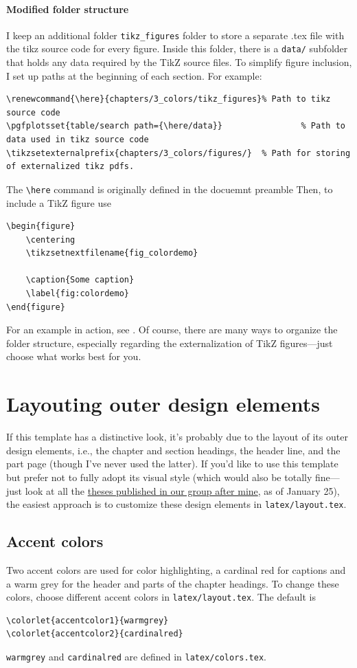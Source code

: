\paragraph{Modified folder structure}
I keep an additional folder \verb|tikz_figures| folder to store a separate .tex file with the tikz source code for every figure. Inside this folder, there is a \verb|data/| subfolder that holds any data required by the TikZ source files. To simplify figure inclusion, I set up paths at the beginning of each section. For example:
\begin{lstlisting}
\renewcommand{\here}{chapters/3_colors/tikz_figures}% Path to tikz source code
\pgfplotsset{table/search path={\here/data}}				% Path to data used in tikz source code
\tikzsetexternalprefix{chapters/3_colors/figures/}	% Path for storing of externalized tikz pdfs.
\end{lstlisting}
The \verb|\here| command is originally defined in the docuemnt preamble
Then, to include a TikZ figure use
\begin{lstlisting}
\begin{figure}
	\centering
	\tikzsetnextfilename{fig_colordemo}
	
	\caption{Some caption}
	\label{fig:colordemo}
\end{figure}
\end{lstlisting}
For an example in action, see .
Of course, there are many ways to organize the folder structure, especially regarding the externalization of TikZ figures—just choose what works best for you.

\section[Layouting ``outer'' design elements]{Layouting outer design elements}

If this template has a distinctive look, it's probably due to the layout of its outer design elements, i.e., the chapter and section headings, the header line, and the part page (though I’ve never used the latter). If you'd like to use this template but prefer not to fully adopt its visual style (which would also be totally fine---just look at all the \href{https://www.thp.uni-koeln.de/trebst/thesisprojects.shtml}{theses published in our group after mine}, as of January 25), the easiest approach is to customize these design elements in \verb|latex/layout.tex|.


\subsection{Accent colors}
Two accent colors are used for color highlighting, a cardinal red for captions and a warm grey for the header and parts of the chapter headings. To change these colors, choose different accent colors in \verb|latex/layout.tex|. The default is
\begin{lstlisting}
\colorlet{accentcolor1}{warmgrey}
\colorlet{accentcolor2}{cardinalred}
\end{lstlisting}
\verb|warmgrey| and \verb|cardinalred| are defined in \verb|latex/colors.tex|. 

